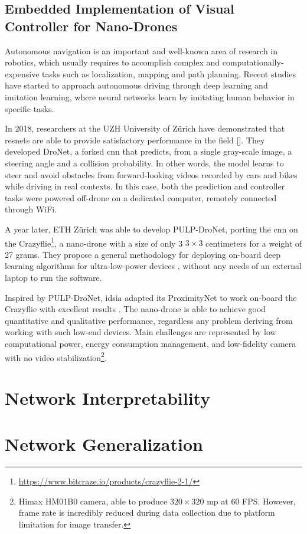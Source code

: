 \subsection{Embedded Implementation of Visual Controller for Nano-Drones}
\label{subsec:sota-nicky}

Autonomous navigation is an important and well-known area of research in robotics, which usually requires to accomplish complex and computationally-expensive tasks such as localization, mapping and path planning. Recent studies have started to approach autonomous driving through deep learning and imitation learning\cite{imitation-learning}, where neural networks learn by imitating human behavior in specific tasks. 

\medskip

In 2018, researchers at the UZH University of Zürich have demonstrated that \gls{resnet}s are able to provide satisfactory performance in the field [\cite{Loquercio_2018}]. They developed DroNet, a forked \gls{cnn} that predicts, from a single gray-scale image, a steering angle and a collision probability. In other words, the model learns to steer and avoid obstacles from forward-looking videos recorded by cars and bikes while driving in real contexts. In this case, both the prediction and controller tasks were powered off-drone on a dedicated computer, remotely connected through WiFi. 

A year later, ETH Zürich was able to develop PULP-DroNet, porting the \gls{cnn} on the Crazyflie\footnote{\url{https://www.bitcraze.io/products/crazyflie-2-1/}}, a nano-drone with a size of only 3 $3 \times 3$ centimeters for a weight of 27 grams. They propose a general methodology for deploying on-board deep learning algorithms for  ultra-low-power devices \cite{palossi2019pulpdronetIoTJ}, without any needs of an external laptop to run the software.

\medskip

Inspired by PULP-DroNet, \gls{idsia} adapted its ProximityNet to work on-board the Crazyflie with excellent results \cite{zimmerman2020thesis}. The nano-drone is able to achieve good quantitative and qualitative performance, regardless any problem deriving from working with such low-end devices. Main challenges are represented by low computational power, energy consumption management, and low-fidelity camera with no video stabilization\footnote{Himax HM01B0 camera, able to produce $320 \times 320$ \gls{mp} at 60 FPS. However, frame rate is incredibly reduced during data collection due to platform limitation for image transfer.}.




\section{Network Interpretability}
\label{sec:network-interpretability}




\section{Network Generalization}
\label{sec:network-generalization}





